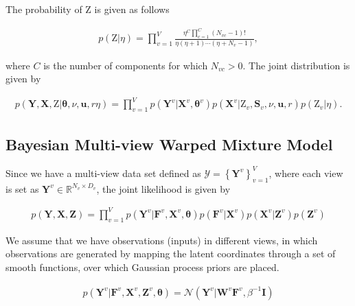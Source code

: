 \documentclass[]{article}
\newcommand{\gD}[2]{\mathcal{N}\left(#1,#2\right)}
\newcommand{\Z}{\boldsymbol{\mathrm{Z}}}
\newcommand{\eye}{\mathbf{I}}
\newcommand{\Scluster}{\mathbf{S}}
\newcommand{\setWv}{\mathbf{W}^{v}}
\newcommand{\setYv}{\mathbf{Y}^{v}}
\newcommand{\setY}{\mathbf{Y}}
\newcommand{\setXv}{\mathbf{X}^{v}}
\newcommand{\setZv}{\mathbf{Z}^{v}}
\newcommand{\setFv}{\mathbf{F}^{v}}
\newcommand{\setX}{\mathbf{X}}
\newcommand{\hParams}{\boldsymbol{\theta}}
\newcommand{\hParamsv}{\boldsymbol{\theta}^{v}}
\begin{document}
The probability of $\Z$ is given as follows 

\begin{align}
p\left(\Z|\eta\right) = \prod_{v=1}^{V}\frac{\eta^C \prod_{c=1}^{C}\left(N_{vc}-1\right)!}{\eta\left(\eta+1\right)\cdots\left(\eta+ N_v -1\right)},
\end{align}

where $C$ is the number of components for which $N_{vc} >
0$. The joint distribution is given by

\begin{align}
p\left(\setY,\setX,\Z|\hParams,\nu,\mathbf{u},r\eta\right) = \prod_{v=1}^{V}p\left(\setYv|\setXv,\hParamsv\right)p\left(\setXv|\Z_v,\Scluster_v , \nu,\mathbf{u},r\right)p\left(\Z_v|\eta\right).
\end{align}

\subsection{Bayesian Multi-view Warped Mixture Model}

Since we have a multi-view data set defined as $\mathcal{Y}=\left\{\mathbf{Y}^{v}\right\}_{v=1}^{V}$, where each view is set as $\mathbf{Y}^{v}\in \mathbb{R}^{N_v\times D_v}$, the joint likelihood is given by 


\begin{align}
p\left(\mathbf{Y},\mathbf{X},\mathbf{Z}\right) = \prod_{v=1}^{V}p\left(\setYv|\setFv,\setXv,
\hParams\right)p\left(\setFv|\setXv\right)p\left(\setXv|\setZv\right)p\left(\setZv\right)
\end{align}


We assume that we have observations (inputs) in different views, in which observations are generated by mapping the latent coordinates through a set of smooth functions, over which Gaussian process priors are placed.

\begin{align}
p\left(\setYv|\setFv,\setXv,\setZv,\hParams\right) = \gD{\setYv|\setWv\setFv}{\beta^{-1}\eye}
\end{align}





\end{document}
